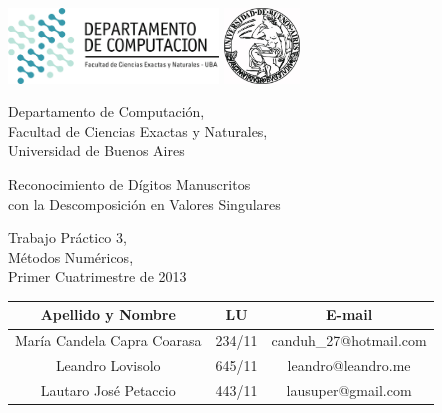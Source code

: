 \documentclass[a4paper,10pt,twoside]{article}
\begin{document}


\thispagestyle{caratula}

\begin{center}

\includegraphics[height=2cm]{DC.png} 
\hfill
\includegraphics[height=2cm]{UBA.jpg} 

\vspace{2cm}

Departamento de Computación,\\
Facultad de Ciencias Exactas y Naturales,\\
Universidad de Buenos Aires

\vspace{2cm}

\begin{spacing}{1}
\begin{Huge}

Reconocimiento de Dígitos Manuscritos\\
con la Descomposición en Valores Singulares

\end{Huge}
\end{spacing}

\vspace{2cm}

Trabajo Práctico 3, \\
Métodos Numéricos, \\
Primer Cuatrimestre de 2013

\vspace{3cm}

\begin{tabular}{|c|c|c|}
\hline
Apellido y Nombre & LU & E-mail\\
\hline
María Candela Capra Coarasa & 234/11 & canduh\_27@hotmail.com\\
Leandro Lovisolo            & 645/11 & leandro@leandro.me\\
Lautaro José Petaccio       & 443/11 & lausuper@gmail.com\\
\hline
\end{tabular}

\end{center}
\end{document}
